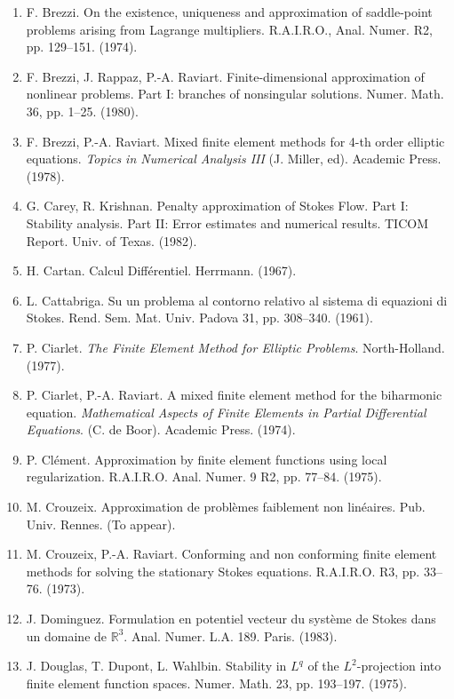 \begin{enumerate}
\item F. Brezzi. On the existence, uniqueness and approximation of saddle-point problems arising from Lagrange multipliers. R.A.I.R.O., Anal. Numer. R2, pp. 129--151. (1974).
\item {}F. Brezzi, J. Rappaz, P.-A. Raviart. Finite-dimensional approximation of nonlinear problems. Part I: branches of nonsingular solutions. Numer. Math. 36, pp. 1--25. (1980).
\item {}F. Brezzi, P.-A. Raviart. Mixed finite element methods for 4-th order elliptic equations. \textit{Topics in Numerical Analysis III} (J. Miller, ed). Academic Press. (1978).
\item G. Carey, R. Krishnan. Penalty approximation of Stokes Flow. Part I: Stability analysis. Part II: Error estimates and numerical results. TICOM Report. Univ. of Texas. (1982).
\item H. Cartan. Calcul Différentiel. Herrmann. (1967).
\item {}L. Cattabriga. Su un problema al contorno relativo al sistema di equazioni di Stokes. Rend. Sem. Mat. Univ. Padova 31, pp. 308--340. (1961).
\item P. Ciarlet. \textit{The Finite Element Method for Elliptic Problems}. North-Holland. (1977).
\item P. Ciarlet, P.-A. Raviart. A mixed finite element method for the biharmonic equation. \textit{Mathematical Aspects of Finite Elements in Partial Differential Equations}. (C. de Boor). Academic Press. (1974).
\item P. Clément. Approximation by finite element functions using local regularization. R.A.I.R.O. Anal. Numer. 9 R2, pp. 77--84. (1975).
\item {}M. Crouzeix. Approximation de problèmes faiblement non linéaires. Pub. Univ. Rennes. (To appear).
\item M. Crouzeix, P.-A. Raviart. Conforming and non conforming finite element methods for solving the stationary Stokes equations. R.A.I.R.O. R3, pp. 33--76. (1973).
\item J. Dominguez. Formulation en potentiel vecteur du système de Stokes dans un domaine de $\mathbb{R}^{3}$. Anal. Numer. L.A. 189. Paris. (1983).
\item J. Douglas, T. Dupont, L. Wahlbin. Stability in $L^{q}$ of the $L^{2}$-projection into finite element function spaces. Numer. Math. 23, pp. 193--197. (1975).

\end{enumerate}
